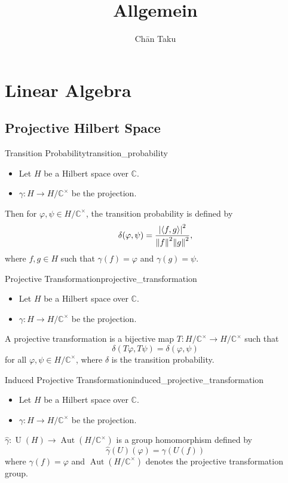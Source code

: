 \documentclass{article}
\title{Allgemein}
\author{Ch\=an Taku}
\begin{document}
\maketitle

\section{Linear Algebra}

\subsection{Projective Hilbert Space}

\begin{definition}{Transition Probability}{transition_probability}
    \begin{itemize}
        \item Let $H$ be a Hilbert space over $\mathbb{C}$.
        \item $\gamma: H\rightarrow H/\mathbb{C}^\times$ be the projection.
    \end{itemize}
    Then for $\varphi,\psi\in H/\mathbb{C}^\times$, the transition probability is defined by
    \[ \delta(\varphi,\psi) = \frac{\abs{\langle f,g \rangle}^2}{\norm{f}^2 \norm{g}^2}, \]
    where $f,g\in H$ such that $\gamma(f) = \varphi$ and $\gamma(g) = \psi$.
\end{definition}

\begin{definition}{Projective Transformation}{projective_transformation}
    \begin{itemize}
        \item Let $H$ be a Hilbert space over $\mathbb{C}$.
        \item $\gamma: H\rightarrow H/\mathbb{C}^\times$ be the projection.
    \end{itemize}
    A projective transformation is a bijective map $T: H/\mathbb{C}^\times \rightarrow H/\mathbb{C}^\times$ such that
    \[ \delta(T\varphi,T\psi) = \delta(\varphi,\psi) \]
    for all $\varphi,\psi\in H/\mathbb{C}^\times$, where $\delta$ is the transition probability.
\end{definition}

\begin{definition}{Induced Projective Transformation}{induced_projective_transformation}
    \begin{itemize}
        \item Let $H$ be a Hilbert space over $\mathbb{C}$.
        \item $\gamma: H\rightarrow H/\mathbb{C}^\times$ be the projection.
    \end{itemize}
    $\hat{\gamma}:\operatorname{U}(H)\rightarrow \operatorname{Aut}(H/\mathbb{C}^\times)$ is a group homomorphism defined by
    \[ \hat{\gamma}(U)(\varphi) = \gamma(U(f)) \]
    where $\gamma(f) = \varphi$ and $\operatorname{Aut}(H/\mathbb{C}^\times)$ denotes the projective transformation group.
\end{definition}
\end{document}
